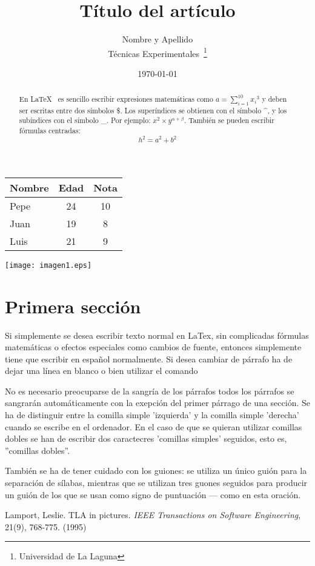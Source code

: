 \documentclass[a4paper,12pt]{article}
\begin{document}
\title{Título del artículo}
\author{Nombre y Apellido \\
Técnicas Experimentales~\footnote{Universidad de La Laguna}
}
\date{\today}
\maketitle
\begin{abstract}
En \LaTeX{}~\cite{Lam:86} es sencillo escribir expresiones
matemáticas como $a=\sum_{i=1}^{10} {x_i}^{3}$
y deben ser escritas entre dos símbolos \$.
Los superíndices se obtienen con el símbolo \^{}, y
los subíndices con el símbolo \_.
Por ejemplo: $x^2 \times y^{\alpha + \beta}$.
También se pueden escribir fórmulas centradas:
\[h^2=a^2 + b^2 \]
\end{abstract}
\bigskip
\begin{tabular}{|l|c|c|}
\hline
Nombre & Edad & Nota \\ \hline
Pepe & 24 & 10 \\ \hline
Juan & 19 & 8 \\ \hline
Luis & 21 & 9 \\ \hline
\end{tabular}
\texttt{[image: imagen1.eps]}
\section{Primera sección}
Si simplemente se desea escribir texto normal en LaTex,
sin complicadas f\'ormulas matem\'aticas o efectos especiales
como cambios de fuente, entonces simplemente tiene que escribir
en espa\~nol normalmente.
Si desea cambiar de párrafo ha de dejar una línea en blanco o bien
utilizar el comando \par
No es necesario preocuparse de la sangría de los párrafos
todos los párrafos se sangrarán automáticamente con la exepción
del primer párrago de una sección.
Se ha de distinguir entre la comilla simple 'izquierda'
y la comilla simple 'derecha' cuando se escribe en el ordenador.
En el caso de que se quieran utilizar comillas dobles se han de 
escribir dos caractecres 'comillas simples' seguidos, esto es,
''comillas dobles''. \par
También se ha de tener cuidado con los guiones: se utiliza un único
guión para la separación de sílabas, mientras que se utilizan
tres guones seguidos para producir un guión de los que se usan
como signo de puntuación --- como en esta oración.
\begin{thebibliography}{00}
Lamport, Leslie.
TLA in pictures.
\emph{IEEE Transactions on Software Engineering},
21(9), 768-775.
(1995)
\end{thebibliography}
\end{document}
